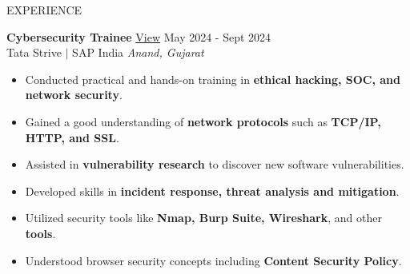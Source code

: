 \documentclass{resume} %
\begin{document}
\begin{rSection}{EXPERIENCE}

\textbf{Cybersecurity Trainee} \href{https://bit.ly/basakstrive}{View} \hfill May 2024 - Sept 2024\\
Tata Strive $|$ SAP India \hfill \textit{Anand, Gujarat}
 \begin{itemize}
    \item Conducted practical and hands-on training in \textbf{ethical hacking, SOC, and network security}.
    \item Gained a good understanding of \textbf{network protocols} such as \textbf{TCP/IP, HTTP, and SSL}.
    \item Assisted in \textbf{vulnerability research} to discover new software vulnerabilities.
    \item Developed skills in \textbf{incident response, threat analysis and mitigation}.
    \item Utilized security tools like \textbf{Nmap, Burp Suite, Wireshark}, and other \textbf{tools}.
    \item Understood browser security concepts including \textbf{Content Security Policy}.
 \end{itemize}


\end{rSection}
\end{document}
